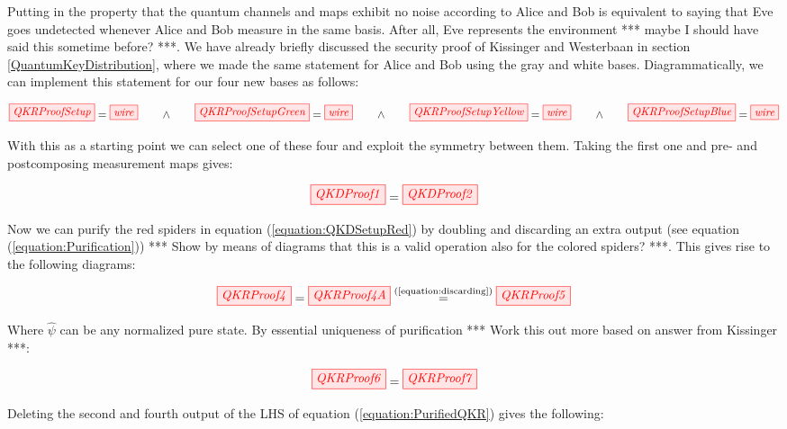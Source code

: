 \documentclass[]{article}
\newcommand{\equaltext}[1]{\ensuremath{\stackrel{\text{#1}}{=}}}
\begin{document}
Putting in the property that the quantum channels and maps exhibit no noise according to Alice and Bob is equivalent to saying that Eve goes undetected whenever Alice and Bob measure in the same basis. After all, Eve represents the environment *** maybe I should have said this sometime before? ***. We have already briefly discussed the security proof of Kissinger and Westerbaan in section \ref{QuantumKeyDistribution}, where we made the same statement for Alice and Bob using the gray and white bases. Diagrammatically, we can implement this statement for our four new bases as follows:

\begin{equation}
	\label{equation:coloredspiders}
	\tikzfig{QKRProofSetup} = \tikzfig{wire} ~~~~~~ \land ~~~~~~ \tikzfig{QKRProofSetupGreen} = \tikzfig{wire} ~~~~~~ \land ~~~~~~ \tikzfig{QKRProofSetupYellow} = \tikzfig{wire} ~~~~~~ \land ~~~~~~ \tikzfig{QKRProofSetupBlue} = \tikzfig{wire}
\end{equation}

With this as a starting point we can select one of these four and exploit the symmetry between them. Taking the first one and pre- and postcomposing measurement maps gives:

\begin{equation}
	\label{equation:QKDSetupRed}
	\tikzfig{QKDProof1} = \tikzfig{QKDProof2}
\end{equation}

Now we can purify the red spiders in equation (\ref{equation:QKDSetupRed}) by doubling and discarding an extra output (see equation (\ref{equation:Purification})) *** Show by means of diagrams that this is a valid operation also for the colored spiders? ***. This gives rise to the following diagrams:

\begin{equation}
	\tikzfig{QKRProof4} = \tikzfig{QKRProof4A} \equaltext{(\ref{equation:discarding})} \tikzfig{QKRProof5}
\end{equation}

Where $\hat{\psi}$ can be any normalized pure state. By essential uniqueness of purification *** Work this out more based on answer from Kissinger ***:

\begin{equation}
	\label{equation:PurifiedQKR}
	\tikzfig{QKRProof6} = \tikzfig{QKRProof7}
\end{equation}

Deleting the second and fourth output of the LHS of equation (\ref{equation:PurifiedQKR}) gives the following:
\end{document}
